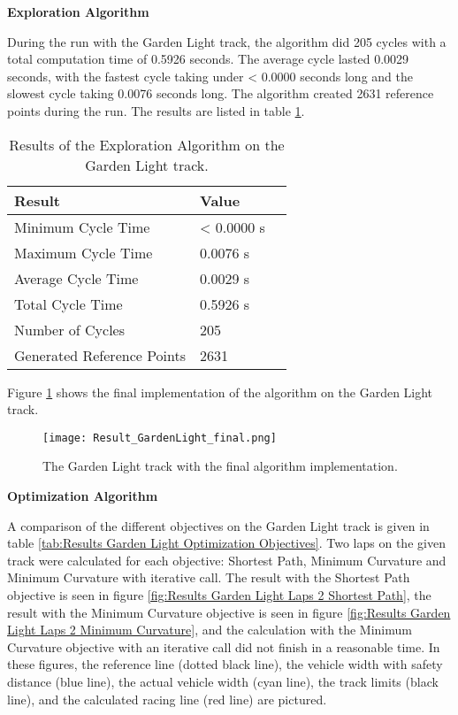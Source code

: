 \textbf{Exploration Algorithm}

During the run with the Garden Light track, the algorithm did 205 cycles with a total computation time of 0.5926 seconds. The average cycle lasted 0.0029 seconds, with the fastest cycle taking under < 0.0000 seconds long and the slowest cycle taking 0.0076 seconds long. The algorithm created 2631 reference points during the run. The results are listed in table \ref{tab:Results Garden Light Exploration}.

\begin{table}[H]
    \centering
    \begin{tabular}{|l|l|l|}
        \hline
        \textbf{Result}            & \textbf{Value} \\ \hline
        Minimum Cycle Time         & < 0.0000 s     \\ \hline
        Maximum Cycle Time         & 0.0076 s       \\ \hline
        Average Cycle  Time        & 0.0029 s       \\ \hline
        Total Cycle Time           & 0.5926 s       \\ \hline
        Number of Cycles           & 205            \\ \hline
        Generated Reference Points & 2631           \\ \hline
    \end{tabular}
    \caption{Results of the Exploration Algorithm on the Garden Light track.}
    \label{tab:Results Garden Light Exploration}
\end{table}

Figure \ref{fig:Result Garden Light Final} shows the final implementation of the algorithm on the Garden Light track.
\begin{figure}[H]
    \centering
    \texttt{[image: Result\_GardenLight\_final.png]}
    \caption{The Garden Light track with the final algorithm implementation.}
    \label{fig:Result Garden Light Final}
\end{figure}

\textbf{Optimization Algorithm}

A comparison of the different objectives on the Garden Light track is given in table \ref{tab:Results Garden Light Optimization Objectives}. Two laps on the given track were calculated for each objective: Shortest Path, Minimum Curvature and Minimum Curvature with iterative call. The result with the Shortest Path objective is seen in figure \ref{fig:Results Garden Light Laps 2 Shortest Path}, the result with the Minimum Curvature objective is seen in figure \ref{fig:Results Garden Light Laps 2 Minimum Curvature}, and the calculation with the Minimum Curvature objective with an iterative call did not finish in a reasonable time. In these figures, the reference line (dotted black line), the vehicle width with safety distance (blue line), the actual vehicle width (cyan line), the track limits (black line), and the calculated racing line (red line) are pictured.


